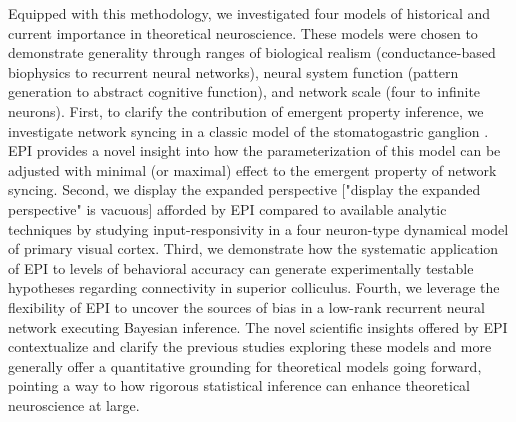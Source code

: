 \documentclass[11pt]{article}
\begin{document}
Equipped with this methodology, we investigated four models of historical and current importance in theoretical neuroscience.
These models were chosen to demonstrate generality through ranges of biological realism (conductance-based biophysics to recurrent neural networks), neural system function (pattern generation to abstract cognitive function), and network scale (four to infinite neurons).
First, to clarify the contribution of emergent property inference, we investigate network syncing in a classic model of the stomatogastric ganglion \cite{gutierrez2013multiple}.  
EPI provides a novel insight into how the parameterization of this model can be adjusted with minimal (or maximal) effect to the emergent property of network syncing.   
Second, we display the expanded perspective ["display the expanded perspective" is vacuous] afforded by EPI compared to available analytic techniques by studying input-responsivity in a four neuron-type dynamical model of primary visual cortex.  
Third, we demonstrate how the systematic application of EPI to levels of behavioral accuracy can generate experimentally testable hypotheses regarding connectivity in superior colliculus.  
Fourth, we leverage the flexibility of EPI to uncover the sources of bias in a low-rank recurrent neural network executing Bayesian inference.  
The novel scientific insights offered by EPI contextualize and clarify the previous studies exploring these models and more generally offer a quantitative grounding for theoretical models  going forward, pointing a way to how rigorous statistical inference can enhance theoretical neuroscience at large.


\end{document}
